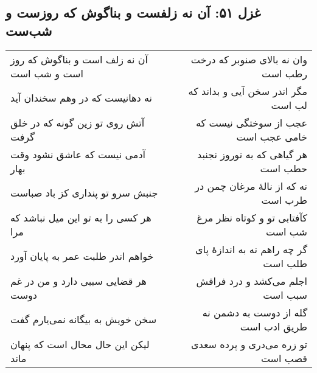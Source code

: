\begin{center}
\section*{غزل ۵۱: آن نه زلفست و بناگوش که روزست و شب‌ست}
\label{sec:051}
\begin{longtable}{l p{0.5cm} r}
آن نه زلف است و بناگوش که روز است و شب است
&&
وان نه بالای صنوبر که درخت رطب است
\\
نه دهانیست که در وهم سخندان آید
&&
مگر اندر سخن آیی و بداند که لب است
\\
آتش روی تو زین گونه که در خلق گرفت
&&
عجب از سوختگی نیست که خامی عجب است
\\
آدمی نیست که عاشق نشود وقت بهار
&&
هر گیاهی که به نوروز نجنبد حطب است
\\
جنبش سرو تو پنداری کز باد صباست
&&
نه که از نالهٔ مرغان چمن در طرب است
\\
هر کسی را به تو این میل نباشد که مرا
&&
کآفتابی تو و کوتاه نظر مرغ شب است
\\
خواهم اندر طلبت عمر به پایان آورد
&&
گر چه راهم نه به اندازهٔ پای طلب است
\\
هر قضایی سببی دارد و من در غم دوست
&&
اجلم می‌کشد و درد فراقش سبب است
\\
سخن خویش به بیگانه نمی‌یارم گفت
&&
گله از دوست به دشمن نه طریق ادب است
\\
لیکن این حال محال است که پنهان ماند
&&
تو زره می‌دری و پرده سعدی قصب است
\\
\end{longtable}
\end{center}
